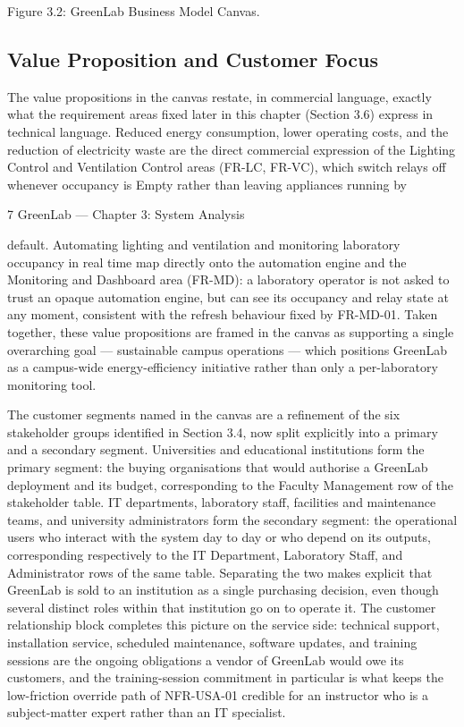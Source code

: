 Figure 3.2: GreenLab Business Model Canvas.

\subsection{Value Proposition and Customer Focus}

The value propositions in the canvas restate, in commercial language, exactly what the requirement
areas fixed later in this chapter (Section 3.6) express in technical language. Reduced energy
consumption, lower operating costs, and the reduction of electricity waste are the direct
commercial expression of the Lighting Control and Ventilation Control areas (FR-LC, FR-VC),
which switch relays off whenever occupancy is Empty rather than leaving appliances running by

7
GreenLab --- Chapter 3: System Analysis


default. Automating lighting and ventilation and monitoring laboratory occupancy in real time map
directly onto the automation engine and the Monitoring and Dashboard area (FR-MD): a laboratory
operator is not asked to trust an opaque automation engine, but can see its occupancy and relay
state at any moment, consistent with the refresh behaviour fixed by FR-MD-01. Taken together,
these value propositions are framed in the canvas as supporting a single overarching goal ---
sustainable campus operations --- which positions GreenLab as a campus-wide energy-efficiency
initiative rather than only a per-laboratory monitoring tool.

The customer segments named in the canvas are a refinement of the six stakeholder groups
identified in Section 3.4, now split explicitly into a primary and a secondary segment. Universities
and educational institutions form the primary segment: the buying organisations that would
authorise a GreenLab deployment and its budget, corresponding to the Faculty Management row of
the stakeholder table. IT departments, laboratory staff, facilities and maintenance teams, and
university administrators form the secondary segment: the operational users who interact with the
system day to day or who depend on its outputs, corresponding respectively to the IT Department,
Laboratory Staff, and Administrator rows of the same table. Separating the two makes explicit that
GreenLab is sold to an institution as a single purchasing decision, even though several distinct roles
within that institution go on to operate it. The customer relationship block completes this picture on
the service side: technical support, installation service, scheduled maintenance, software updates,
and training sessions are the ongoing obligations a vendor of GreenLab would owe its customers,
and the training-session commitment in particular is what keeps the low-friction override path of
NFR-USA-01 credible for an instructor who is a subject-matter expert rather than an IT specialist.

